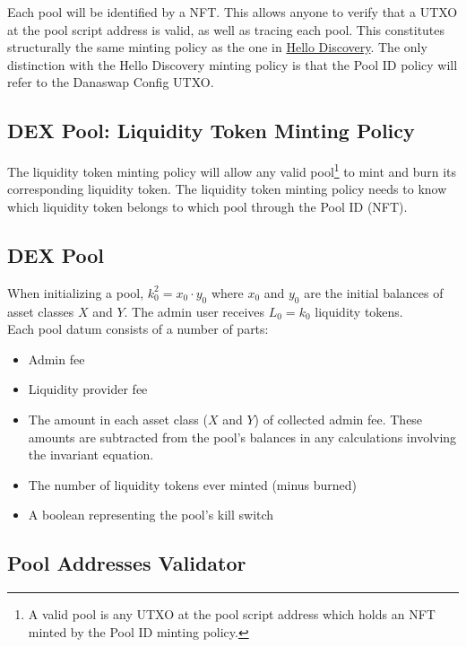 \documentclass{article}
\begin{document}
Each pool will be identified by a NFT. This allows anyone to verify that a UTXO
at the pool script address is valid, as well as tracing each pool. This
constitutes structurally the same minting policy as the one in
\href{https://github.com/ArdanaLabs/cardano-app-template/blob/master/onchain/src/HelloDiscovery.hs}{
  Hello Discovery}.
The only distinction with the Hello Discovery minting policy is that the Pool ID
policy will refer to the Danaswap Config UTXO.

\subsection{DEX Pool: Liquidity Token Minting Policy}

The liquidity token minting policy will allow any valid pool\footnote{
  A valid pool is any UTXO at the pool script address which holds an NFT minted
  by the Pool ID minting policy.
} to mint and burn its corresponding liquidity token. The liquidity token
minting policy needs to know which liquidity token belongs to which pool through the
Pool ID (NFT).

\subsection{DEX Pool}

When initializing a pool, $k_0^2 = x_0 \cdot y_0$ where $x_0$ and $y_0$ are the
initial balances of asset classes $X$ and $Y$. The admin user receives $L_0 =
k_0$ liquidity tokens. \\

Each pool datum consists of a number of parts:
\begin{itemize}
  \item Admin fee
  \item Liquidity provider fee
  \item The amount in each asset class ($X$ and $Y$) of collected admin fee.
    These amounts are subtracted from the pool's balances in any calculations
    involving the invariant equation.
  \item The number of liquidity tokens ever minted (minus burned)
  \item A boolean representing the pool's kill switch
\end{itemize}

\subsection{Pool Addresses Validator}
\end{document}
